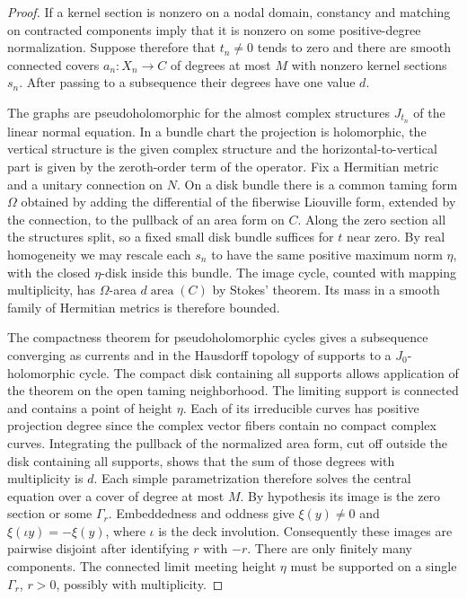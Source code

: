 \begin{proof}
If a kernel section is nonzero on a nodal domain, constancy and
matching on contracted components imply that it is nonzero on
some positive-degree normalization. Suppose therefore that
$t_n\ne0$ tends to zero and there are smooth connected covers
$a_n:X_n\to C$ of degrees at most $M$ with nonzero kernel sections
$s_n$. After passing to a subsequence their degrees have one value $d$.

The graphs are pseudoholomorphic for the almost complex structures
$J_{t_n}$ of the linear normal equation. In a bundle chart the
projection is holomorphic, the vertical structure is the given
complex structure and the horizontal-to-vertical part is given by the
zeroth-order term of the operator. Fix a Hermitian metric and a
unitary connection on $N$. On a disk bundle there is a common taming
form $\Omega$ obtained by adding the differential of the fiberwise
Liouville form, extended by the connection, to the pullback of an area
form on $C$. Along the zero section all the structures split, so a
fixed small disk bundle suffices for $t$ near zero. By real homogeneity
we may rescale each $s_n$ to have the same positive maximum norm
$\eta$, with the closed $\eta$-disk inside this bundle. The image
cycle, counted with mapping multiplicity, has $\Omega$-area
$d\operatorname{area}(C)$ by Stokes' theorem. Its mass in a smooth
family of Hermitian metrics is therefore bounded.

The compactness theorem for pseudoholomorphic cycles
\cite[Definition~2.6 and Theorem~2.11]{diw} gives a subsequence
converging as currents and in the Hausdorff topology of supports to
a $J_0$-holomorphic cycle. The compact disk containing all supports
allows application of the theorem on the open taming neighborhood.
The limiting support is connected and contains a point of height
$\eta$. Each of its irreducible curves has positive projection degree
since the complex vector fibers contain no compact complex curves.
Integrating the pullback of the normalized area form, cut off outside
the disk containing all supports, shows that the sum of those degrees
with multiplicity is $d$. Each simple parametrization therefore
solves the central equation over a cover of degree at most $M$. By
hypothesis its image is the zero section or some $\Gamma_r$.
Embeddedness and oddness give $\xi(y)\ne0$ and
$\xi(\iota y)=-\xi(y)$, where $\iota$ is the deck involution.
Consequently these images are pairwise disjoint after identifying
$r$ with $-r$. There are only finitely many components. The connected
limit meeting height $\eta$ must be supported on a single
$\Gamma_r$, $r>0$, possibly with multiplicity.


\end{proof}
